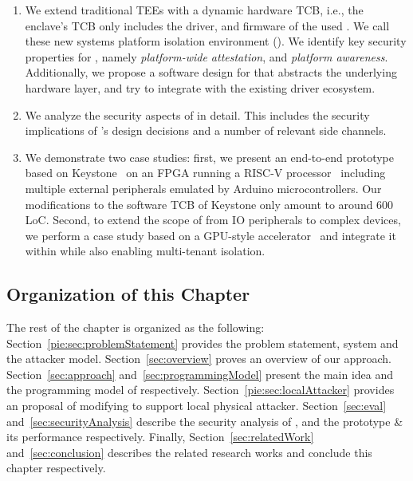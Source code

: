 \begin{enumerate}
  \item We extend traditional TEEs with a dynamic hardware TCB, i.e., the enclave's TCB only includes the driver, and firmware of the used \sphw. We call these new systems platform isolation environment (\name{}). We identify key security properties for \name{}, namely \emph{platform-wide attestation}, and \emph{platform awareness}. Additionally, we propose a software design for \name that abstracts the underlying hardware layer, and try to integrate with the existing driver ecosystem. 
  
  \item We analyze the security aspects of \name in detail. This includes the security implications of \name{}'s design decisions and a number of relevant side channels.
  
  \item We demonstrate two case studies: first, we present an end-to-end prototype based on Keystone~\cite{keystone} on an FPGA running a RISC-V processor~\cite{ariane} including multiple external peripherals emulated by Arduino microcontrollers. Our modifications to the software TCB of Keystone only amount to around 600 LoC. Second, to extend the scope of \name from IO peripherals to complex devices, we perform a case study based on a GPU-style accelerator~\cite{zaruba2020manticore} and integrate it within \name{} while also enabling multi-tenant isolation.

\end{enumerate}


\subsection{Organization of this Chapter}

The rest of the chapter is organized as the following: Section~\ref{pie:sec:problemStatement} provides the problem statement, system and the attacker model. Section~\ref{sec:overview} proves an overview of our approach. Section~\ref{sec:approach} and~\ref{sec:programmingModel} present the main idea and the programming model of \name respectively. Section~\ref{pie:sec:localAttacker} provides an proposal of modifying \name to support local physical attacker. Section~\ref{sec:eval} and~\ref{sec:securityAnalysis} describe the security analysis of \name, and  the \name prototype \& its performance respectively. Finally, Section~\ref{sec:relatedWork} and~\ref{sec:conclusion} describes the related research works and conclude this chapter respectively. 